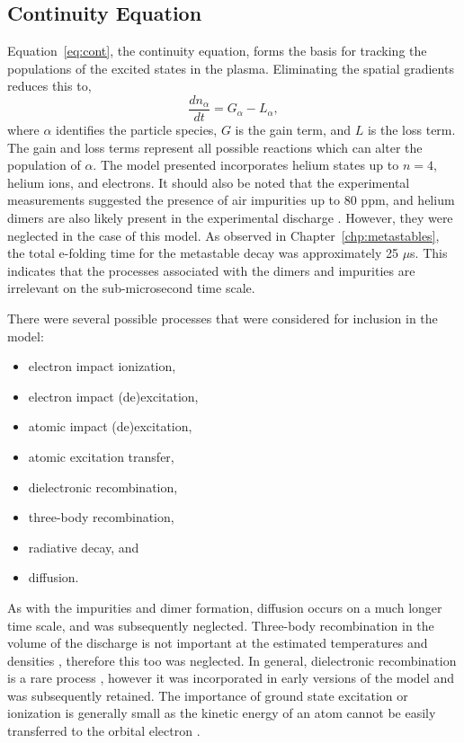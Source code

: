 \subsection{Continuity Equation}

Equation~\ref{eq:cont}, the continuity equation, forms the basis for tracking
the populations of the excited states in the plasma. Eliminating the spatial
gradients reduces this to,
\begin{equation}
  \frac{d n_\alpha}{dt} = G_\alpha - L_\alpha,
  \label{eq:zdmcont}
\end{equation}
where $\alpha$ identifies the particle species, $G$ is the gain term, and $L$ is
the loss term. The gain and loss terms represent all possible reactions which
can alter the population of $\alpha$. The model presented incorporates helium
states up to $n=4$, helium ions, and electrons. It should also be noted that the
experimental measurements suggested the presence of air impurities up to 80 ppm,
and helium dimers are also likely present in the experimental discharge
\cite{Pouvesle1988}. However, they were neglected in the case of this model. As
observed in Chapter~\ref{chp:metastables}, the total e-folding time for the
metastable decay was approximately 25 $\mu$s. This indicates that the processes
associated with the dimers and impurities are irrelevant on the sub-microsecond
time scale.

There were several possible processes that were considered for inclusion in the
model:
\begin{itemize}
  \singlespacing
  \item electron impact ionization,
  \item electron impact (de)excitation,
  \item atomic impact (de)excitation,
  \item atomic excitation transfer,
  \item dielectronic recombination,
  \item three-body recombination,
  \item radiative decay, and
  \item diffusion.
\end{itemize}
As with the impurities and dimer formation, diffusion occurs on a much longer
time scale, and was subsequently neglected. Three-body recombination in the
volume of the discharge is not important at the estimated temperatures and
densities \cite{Lieberman2005}, therefore this too was neglected. In general,
dielectronic recombination is a rare process \cite{Nahar2010}, however it was
incorporated in early versions of the model and was subsequently retained. The
importance of ground state excitation or ionization is generally small as the
kinetic energy of an atom cannot be easily transferred to the orbital electron
\cite{Lieberman2005}.

